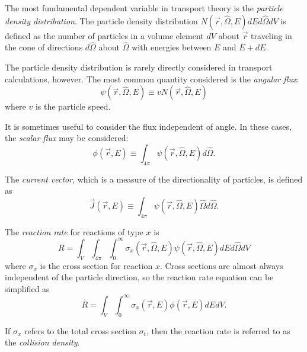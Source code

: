 The most fundamental dependent variable in transport theory is the \textit{particle density distribution}.
The particle density distribution $N\left(\vec{r},\hat{\Omega},E\right)dEd\hat{\Omega}dV$ is defined as the number of particles in a volume element $dV$ about $\vec{r}$ traveling in the cone of directions $d\hat{\Omega}$ about $\hat{\Omega}$ with energies between $E$ and $E + dE$.

The particle density distribution is rarely directly considered in transport calculations, however.
The most common quantity considered is the \textit{angular flux}:
\begin{equation}\label{eq:bg:rt:angular-flux}
  \psi\left(\vec{r},\hat{\Omega},E\right) \equiv vN\left(\vec{r},\hat{\Omega},E\right)
\end{equation}
where $v$ is the particle speed.

It is sometimes useful to consider the flux independent of angle.
In these cases, the \textit{scalar flux} may be considered:
\begin{equation}\label{eq:bg:rt:scalar-flux}
  \phi\left(\vec{r},E\right) \equiv \int_{4\pi}\psi\left(\vec{r},\hat{\Omega},E\right)d\hat{\Omega}.
\end{equation}

The \textit{current vector}, which is a measure of the directionality of particles, is defined as
\begin{equation}\label{eq:bg:rt:current-vector}
  \vec{J}\left(\vec{r},E\right) \equiv \int_{4\pi}\psi\left(\vec{r},\hat{\Omega},E\right)\hat{\Omega} d\hat{\Omega}.
\end{equation}

The \textit{reaction rate} for reactions of type $x$ is
\begin{equation}\label{eq:bg:rt:rxn-rate-angular}
  R = \int_V\int_{4\pi}\int_0^\infty\sigma_x\left(\vec{r},\hat{\Omega},E\right)\psi\left(\vec{r},\hat{\Omega},E\right)dEd\hat{\Omega}dV
\end{equation}
where $\sigma_x$ is the cross section for reaction $x$.
Cross sections are almost always independent of the particle direction, so the reaction rate equation can be simplified as
\begin{equation}\label{eq:bg:rt:rxn-rate-scalar}
  R = \int_V\int_0^\infty\sigma_x\left(\vec{r},E\right)\phi\left(\vec{r},E\right)dEdV.
\end{equation}

If $\sigma_x$ refers to the total cross section $\sigma_t$, then the reaction rate is referred to as the \textit{collision density}.

